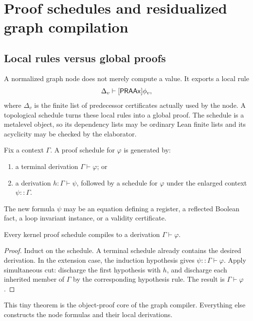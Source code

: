 \section{Proof schedules and residualized graph compilation}\label{sec:graph}

\subsection{Local rules versus global proofs}

A normalized graph node does not merely compute a value.  It exports a local rule
\[
  \Delta_v\vdash[\mathsf{PRAAx}]\phi_v,
\]
where \(\Delta_v\) is the finite list of predecessor certificates actually used by the node.  A topological schedule turns these local rules into a global proof.  The schedule is a metalevel object, so its dependency lists may be ordinary Lean finite lists and its acyclicity may be checked by the elaborator.

\begin{definition}
Fix a context \(\Gamma\).  A proof schedule for \(\varphi\) is generated by:
\begin{enumerate}[label=(\roman*)]
  \item a terminal derivation \(\Gamma\vdash\varphi\); or
  \item a derivation \(h:\Gamma\vdash\psi\), followed by a schedule for \(\varphi\) under the enlarged context \(\psi::\Gamma\).
\end{enumerate}
The new formula \(\psi\) may be an equation defining a register, a reflected Boolean fact, a loop invariant instance, or a validity certificate.
\end{definition}

\begin{theorem}\label{thm:schedule}
Every kernel proof schedule compiles to a derivation \(\Gamma\vdash\varphi\).
\end{theorem}

\begin{proof}
Induct on the schedule.  A terminal schedule already contains the desired derivation.  In the extension case, the induction hypothesis gives \(\psi::\Gamma\vdash\varphi\).  Apply simultaneous cut: discharge the first hypothesis with \(h\), and discharge each inherited member of \(\Gamma\) by the corresponding hypothesis rule.  The result is \(\Gamma\vdash\varphi\).
\end{proof}

This tiny theorem is the object-proof core of the graph compiler.  Everything else constructs the node formulas and their local derivations.

